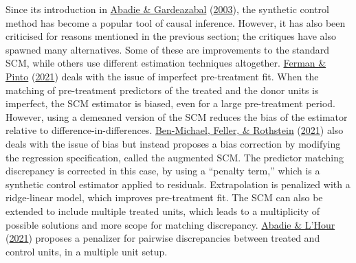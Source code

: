 \documentclass[12pt,nobind, a4paper]{reedthesis}
\begin{document}
 Since its introduction in \protect\hyperlink{ref-abadie_economic_2003}{Abadie \& Gardeazabal} (\protect\hyperlink{ref-abadie_economic_2003}{2003}), the synthetic control method has become a popular tool of causal inference. However, it has also been criticised for reasons mentioned in the previous section; the critiques have also spawned many alternatives. Some of these are improvements to the standard SCM, while others use different estimation techniques altogether. \protect\hyperlink{ref-ferman_synthetic_2021}{Ferman \& Pinto} (\protect\hyperlink{ref-ferman_synthetic_2021}{2021}) deals with the issue of imperfect pre-treatment fit. When the matching of pre-treatment predictors of the treated and the donor units is imperfect, the SCM estimator is biased, even for a large pre-treatment period. However, using a demeaned version of the SCM reduces the bias of the estimator relative to difference-in-differences. \protect\hyperlink{ref-ben-michael_augmented_2021}{Ben-Michael, Feller, \& Rothstein} (\protect\hyperlink{ref-ben-michael_augmented_2021}{2021}) also deals with the issue of bias but instead proposes a bias correction by modifying the regression specification, called the augmented SCM. The predictor matching discrepancy is corrected in this case, by using a ``penalty term,'' which is a synthetic control estimator applied to residuals. Extrapolation is penalized with a ridge-linear model, which improves pre-treatment fit. The SCM can also be extended to include multiple treated units, which leads to a multiplicity of possible solutions and more scope for matching discrepancy. \protect\hyperlink{ref-abadie_penalized_2021}{Abadie \& L'Hour} (\protect\hyperlink{ref-abadie_penalized_2021}{2021}) proposes a penalizer for pairwise discrepancies between treated and control units, in a multiple unit setup.
 \linebreak
\end{document}
